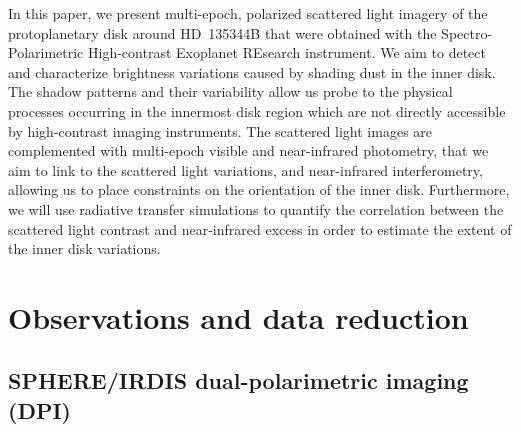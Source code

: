 \documentclass[twocolumn,tighten]{aastex61}
\begin{document}
In this paper, we present multi-epoch, polarized scattered light imagery of the protoplanetary disk around HD~135344B that were obtained with the Spectro-Polarimetric High-contrast Exoplanet REsearch \citep[SPHERE;][]{beuzit2008} instrument. We aim to detect and characterize brightness variations caused by shading dust in the inner disk. The shadow patterns and their variability allow us probe to the physical processes occurring in the innermost disk region which are not directly accessible by high-contrast imaging instruments. The scattered light images are complemented with multi-epoch visible and near-infrared photometry, that we aim to link to the scattered light variations, and near-infrared interferometry, allowing us to place constraints on the orientation of the inner disk. Furthermore, we will use radiative transfer simulations to quantify the correlation between the scattered light contrast and near-infrared excess in order to estimate the extent of the inner disk variations.

\section{Observations and data reduction}\label{sec:observations}

\subsection{SPHERE/IRDIS dual-polarimetric imaging (DPI)}\label{sec:irdis}
\end{document}
